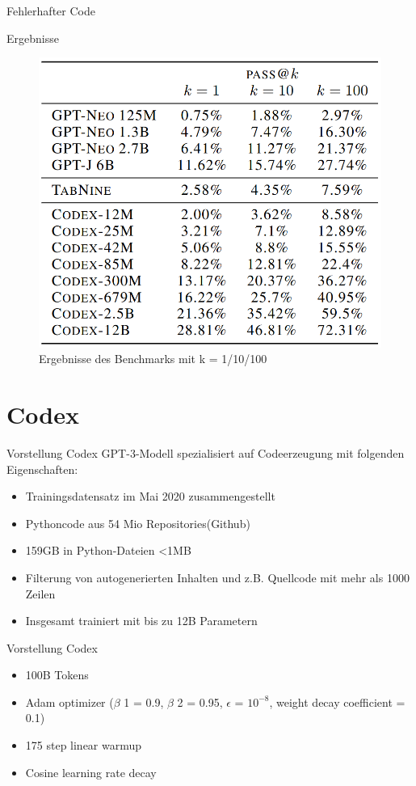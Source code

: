\documentclass{beamer}              %
\begin{document}
\begin{frame}{Fehlerhafter Code}
\begin{frame}{Ergebnisse}
    \begin{figure}
        \centering
        \includegraphics[width=0.55\paperwidth]{images/humanevaleval.png}
        \caption{Ergebnisse des Benchmarks mit k = 1/10/100\cite{chen2021evaluating}}
    \end{figure}
\end{frame}

\section{Codex}
\begin{frame}{Vorstellung Codex}
GPT-3-Modell spezialisiert auf Codeerzeugung mit folgenden Eigenschaften:\cite{chen2021evaluating}
\begin{itemize}
    \item Trainingsdatensatz im Mai 2020 zusammengestellt
    \item Pythoncode aus 54 Mio Repositories(Github)
    \item 159GB in Python-Dateien <1MB
    \item Filterung von autogenerierten Inhalten und z.B. Quellcode mit mehr als 1000 Zeilen
    \item Insgesamt trainiert mit bis zu 12B Parametern
\end{itemize}
\end{frame}

\begin{frame}[fragile]{Vorstellung Codex}
\begin{itemize}
    \item 100B Tokens
    \item Adam optimizer (\(\beta\) 1 = 0.9, \(\beta\) 2 = 0.95, \(\epsilon\) = $10^{-8}$, weight decay coefficient = 0.1)
    \item 175 step linear warmup
    \item Cosine learning rate decay


\end{itemize}
\end{frame}
\end{frame}
\end{document}

